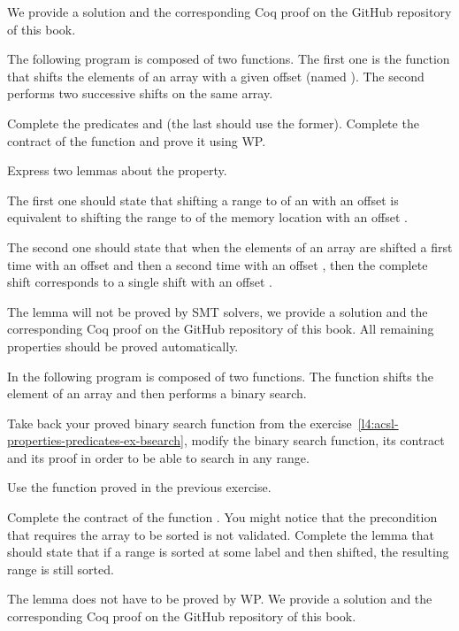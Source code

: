 We provide a solution and the corresponding Coq proof on the GitHub repository
of this book.




The following program is composed of two functions. The first one is the
 function that shifts the elements of an array with a
given offset (named ). The second performs two successive
shifts on the same array.




Complete the predicates  and  (the
last should use the former). Complete the contract of the
 function and prove it using WP.


Express two lemmas about the  property.


The first one  should state that shifting a range
 to  of an  with an
offset  is equivalent to shifting the range  to
 of the memory location  with an offset
.



The second one should state that when the elements of an array are shifted a
first time with an offset  and then a second time with an offset
, then the complete shift corresponds to a single shift with an
offset .



The lemma  will not be proved by SMT solvers, we provide
a solution and the corresponding Coq proof on the GitHub repository of this
book. All remaining properties should be proved automatically.





In the following program is composed of two functions. The function
 shifts the element of an array and then
performs a binary search.




Take back your proved binary search function from the
exercise~\ref{l4:acsl-properties-predicates-ex-bsearch}, modify the binary
search function, its contract and its proof in order to be able to search in
any range.


Use the  function proved in the previous exercise.


Complete the contract of the function . You might
notice that the precondition that requires the array to be sorted is not
validated. Complete the lemma  that should
state that if a range is sorted at some label and then shifted, the resulting
range is still sorted.

The lemma does not have to be proved by WP. We provide a solution and the
corresponding Coq proof on the GitHub repository of this book.
